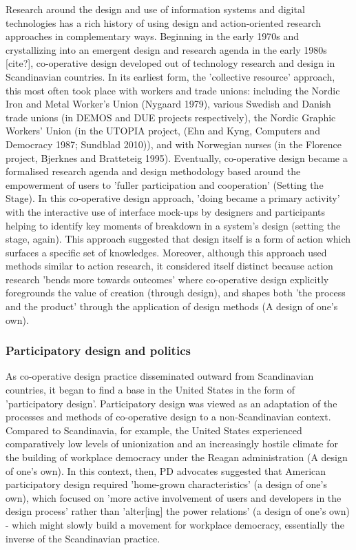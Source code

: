 Research around the design and use of information systems and digital technologies has a rich history of using design and action-oriented research approaches in complementary ways. Beginning in the early 1970s and crystallizing into an emergent design and research agenda in the early 1980s [cite?], co-operative design developed out of technology research and design in Scandinavian countries. In its earliest form, the 'collective resource' approach, this most often took place with workers and trade unions: including the Nordic Iron and Metal Worker's Union (Nygaard 1979), various Swedish and Danish trade unions (in DEMOS and DUE projects respectively),  the Nordic Graphic Workers' Union (in the UTOPIA project, (Ehn and Kyng, Computers and Democracy 1987; Sundblad 2010)), and with Norwegian nurses (in the Florence project, Bjerknes and Bratteteig 1995). Eventually, co-operative design became a formalised research agenda and design methodology based around the empowerment of users to 'fuller participation and cooperation' (Setting the Stage). In this co-operative design approach, 'doing became a primary activity' with the interactive use of interface mock-ups by designers and participants helping to identify key moments of breakdown in a system's design (setting the stage, again). This approach suggested that design itself is a form of action which surfaces a specific set of knowledges. Moreover, although this approach used methods similar to action research, it considered itself distinct because action research 'bends more towards outcomes' where co-operative design explicitly foregrounds the value of creation (through design), and shapes both 'the process and the product' through the application of design methods (A design of one's own). 

\subsubsection{Participatory design and politics}

As co-operative design practice disseminated outward from Scandinavian countries, it began to find a base in the United States in the form of 'participatory design'. Participatory design was viewed as an adaptation of the processes and methods of co-operative design to a non-Scandinavian context. Compared to Scandinavia, for example, the United States experienced comparatively low levels of unionization and an increasingly hostile climate for the building of workplace democracy under the Reagan administration (A design of one's own). In this context, then, PD advocates suggested that American participatory design required 'home-grown characteristics' (a design of one's own), which focused on 'more active involvement of users and developers in the design process' rather than 'alter[ing] the power relations' (a design of one's own) - which might slowly build a movement for workplace democracy, essentially the inverse of the Scandinavian practice.

